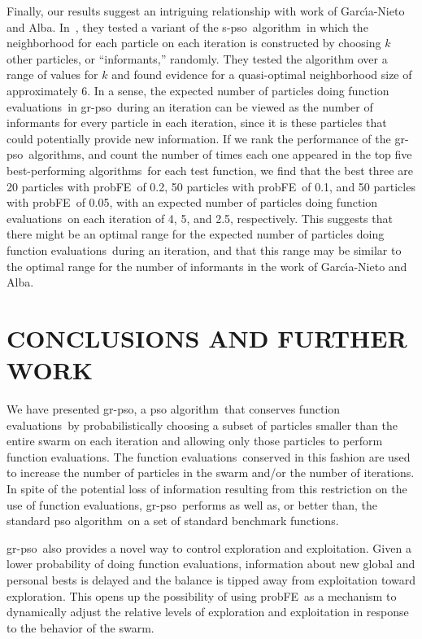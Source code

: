 \documentclass[a4paper,twoside]{article}
\newcommand{\fncevals}{function evaluations}
\newcommand{\pfe}{{probFE}}
\newcommand{\spso}{{\sc s-pso}}
\newcommand{\cfe}{{\sc gr-pso}}
\newcommand{\alg}{algorithm}
\newcommand{\algs}{algorithms}
\newcommand{\psoalg}{{\sc pso} algorithm}
\begin{document}
Finally, our results suggest an intriguing relationship with work of Garc\'{\i}a-Nieto and Alba. In~\cite{garcia-nieto12}, they tested a variant of the \spso\ \alg\ in which the neighborhood for each particle on each iteration is constructed by choosing $k$ other particles, or ``informants,'' randomly.  They tested the algorithm over a range of values for $k$ and found evidence for a quasi-optimal neighborhood size of approximately 6. In a sense, the expected number of particles doing \fncevals\ in \cfe\ during an iteration can be viewed as the number of informants for every particle in each iteration, since it is these particles that could potentially provide new information.  If we rank the performance of the \cfe\ \algs, and count the number of times each one appeared in the top five best-performing \algs\ for each test function, we find that the best three are 20 particles with \pfe\ of 0.2, 50 particles with \pfe\ of 0.1, and 50 particles with \pfe\ of 0.05, with an expected number of particles doing \fncevals\ on each iteration of 4, 5, and 2.5, respectively.  This suggests that there might be an optimal range for the expected number of particles doing \fncevals\ during an iteration, and that this range may be similar to the optimal range for the number of informants in the work of Garc\'{\i}a-Nieto and Alba.







\section{\uppercase{Conclusions and Further Work}}
\label{s:future-work}

We have presented \cfe, a \psoalg\ that conserves \fncevals\ by probabilistically choosing a subset of particles smaller than the entire swarm on each iteration and allowing only those particles to perform \fncevals.  The \fncevals\ conserved in this fashion are used to increase the number of particles in the swarm and/or the number of iterations. In spite of the potential loss of information resulting from this restriction on the use of \fncevals, \cfe\ performs as well as, or better than, the standard \psoalg\ on a set of standard benchmark functions.


\cfe\ also provides a novel way to control exploration and exploitation. Given a lower probability of doing function evaluations, information about new global and personal bests is delayed and
the balance is tipped away from exploitation toward exploration.  This opens up the possibility of using \pfe\ as a mechanism to dynamically adjust the relative levels of exploration and exploitation in response to the behavior of the swarm.
\end{document}
